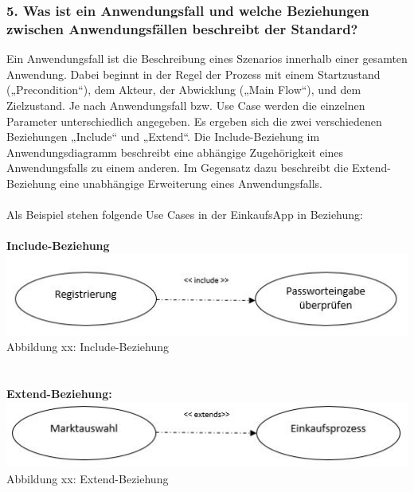 \documentclass[12pt,a4paper]{article}
\begin{document}
\subsubsection*{5. Was ist ein Anwendungsfall und welche Beziehungen zwischen Anwendungsfällen beschreibt der Standard?}
Ein Anwendungsfall ist die Beschreibung eines Szenarios innerhalb einer gesamten Anwendung. 
Dabei beginnt in der Regel der Prozess mit einem Startzustand („Precondition“), dem Akteur, der Abwicklung („Main Flow“), und dem Zielzustand. 
Je nach Anwendungsfall bzw. Use Case werden die einzelnen Parameter unterschiedlich angegeben. Es ergeben sich die zwei verschiedenen Beziehungen „Include“ und „Extend“.
Die Include-Beziehung im Anwendungsdiagramm beschreibt eine abhängige Zugehörigkeit eines Anwendungsfalls zu einem anderen. Im Gegensatz dazu beschreibt die Extend-Beziehung eine unabhängige Erweiterung eines Anwendungsfalls.
\\
\\
Als Beispiel stehen folgende Use Cases in der EinkaufsApp in Beziehung:
\\
\\
\textbf{Include-Beziehung}
\\
\includegraphics[scale=1]{Include_Use-Case.JPG}
\\
\footnotesize Abbildung xx: Include-Beziehung
\normalsize
\\
\\
\\
\textbf{Extend-Beziehung:}
\\
\includegraphics[scale=1]{Extend_Use-Case.JPG}
\\
\footnotesize Abbildung xx: Extend-Beziehung
\normalsize
\\
\newpage
\end{document}
